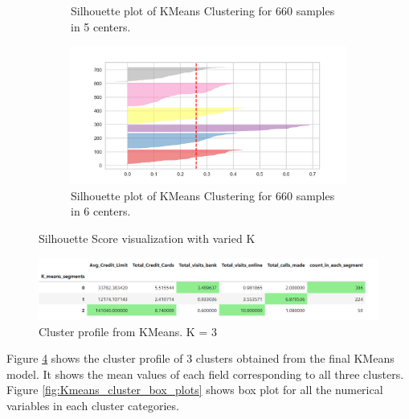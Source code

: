 \documentclass[10pt,a4paper]{style}
\begin{document}
\begin{figure}[h]
\begin{subfigure}[t]{0.49\textwidth}
				\caption{Silhouette plot of KMeans Clustering for 660 samples in 5 centers.}
				\label{fig:silhoute_K_5.png}
			\end{subfigure}
			\hfill
			\begin{subfigure}[t]{0.49\textwidth}
				\includegraphics[width=\textwidth]{silhoute_K_6.png}
				\caption{Silhouette plot of KMeans Clustering for 660 samples in 6 centers.}
				\label{fig:silhoute_K_6.png}
			\end{subfigure}
			\caption{Silhouette Score visualization with varied K}
			\label{fig:Silhouette Score visualization iwith varied K}
		\end{figure}
		
		\begin{figure}[h]
			\centering
			\includegraphics[width=\textwidth]{Kmeans_profile.png}
			\caption{Cluster profile from KMeans. K = 3}
			\label{fig:Kmeans_profile}
		\end{figure}
			Figure \ref{fig:Kmeans_profile} shows the cluster profile of 3 clusters obtained from the final KMeans model. It shows the mean values of each field corresponding to all three clusters. Figure \ref{fig:Kmeans_cluster_box_plots} shows box plot for all the numerical variables in each cluster categories.
		
\end{document}
